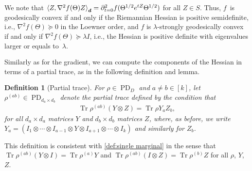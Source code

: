 \documentclass{article}
\newtheorem{definition}{Definition}
\newcommand{\ot}{\otimes}
\renewcommand{\vec}{\bm}
\newcommand\PD{\operatorname{PD}}
\newcommand\tr{\operatorname{Tr}}
\begin{document}
We note that $\braket{Z, \nabla^2 f(\Theta) Z}_{\vec d} = \partial^2_{t=0} f(\Theta^{1/2} e^{tZ} \Theta^{1/2})$ for all $Z\in S$.
Thus, $f$~is geodesically convex if and only if the Riemannian Hessian is positive semidefinite, i.e., $\nabla^2 f(\Theta) \succeq 0$ in the Loewner order, and $f$ is $\lambda$-strongly geodesically convex if and only if $\nabla^2 f(\Theta) \succeq \lambda I$, i.e., the Hessian is positive definite with eigenvalues larger or equals to~$\lambda$.

Similarly as for the gradient, we can compute the components of the Hessian in terms of a partial trace, as in the following definition and lemma.

\begin{definition}[Partial trace]
For $\rho \in \PD_D$ and $a \neq b\in[k]$, let $\rho^{(ab)} \in \PD_{d_a \times d_b}$ denote the \emph{partial trace} defined by the condition that
\begin{align*}
  \tr \rho^{(ab)} (Y \ot Z) = \tr \rho Y_a Z_b,
\end{align*}
for all $d_a \times d_a$ matrices $Y$ and $d_b \times d_b$ matrices $Z$, where, as before, we write~$Y_a = (I_1 \ot \cdots \ot I_{a-1} \ot Y \ot I_{a+1} \ot \cdots \ot I_k)$ and similarly for $Z_b$.
\end{definition}

\noindent
This definition is consistent with \cref{def:single marginal} in the sense that $\tr \rho^{(ab)} (Y \ot I) = \tr \rho^{(a)} Y$ and $\tr \rho^{(ab)} (I \ot Z) = \tr \rho^{(b)} Z$ for all $\rho$, $Y$, $Z$.
\end{document}
